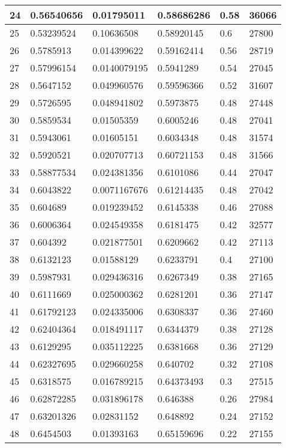 \begin{longtable}{|l|l|l|l|l|l|}
24 & 0.56540656 & 0.01795011 & 0.58686286 & 0.58 & 36066 \\ \hline 
25 & 0.53239524 & 0.10636508 & 0.58920145 & 0.6 & 27800 \\ \hline 
26 & 0.5785913 & 0.014399622 & 0.59162414 & 0.56 & 28719 \\ \hline 
27 & 0.57996154 & 0.0140079195 & 0.5941289 & 0.54 & 27045 \\ \hline 
28 & 0.5647152 & 0.049960576 & 0.59596366 & 0.52 & 31607 \\ \hline 
29 & 0.5726595 & 0.048941802 & 0.5973875 & 0.48 & 27448 \\ \hline 
30 & 0.5859534 & 0.01505359 & 0.6005246 & 0.48 & 27041 \\ \hline 
31 & 0.5943061 & 0.01605151 & 0.6034348 & 0.48 & 31574 \\ \hline 
32 & 0.5920521 & 0.020707713 & 0.60721153 & 0.48 & 31566 \\ \hline 
33 & 0.58877534 & 0.024381356 & 0.6101086 & 0.44 & 27047 \\ \hline 
34 & 0.6043822 & 0.0071167676 & 0.61214435 & 0.48 & 27042 \\ \hline 
35 & 0.604689 & 0.019239452 & 0.6145338 & 0.46 & 27088 \\ \hline 
36 & 0.6006364 & 0.024549358 & 0.6181475 & 0.42 & 32577 \\ \hline 
37 & 0.604392 & 0.021877501 & 0.6209662 & 0.42 & 27113 \\ \hline 
38 & 0.6132123 & 0.01588129 & 0.6233791 & 0.4 & 27100 \\ \hline 
39 & 0.5987931 & 0.029436316 & 0.6267349 & 0.38 & 27165 \\ \hline 
40 & 0.6111669 & 0.025000362 & 0.6281201 & 0.36 & 27147 \\ \hline 
41 & 0.61792123 & 0.024335006 & 0.6308337 & 0.36 & 27460 \\ \hline 
42 & 0.62404364 & 0.018491117 & 0.6344379 & 0.38 & 27128 \\ \hline 
43 & 0.6129295 & 0.035112225 & 0.6381668 & 0.36 & 27129 \\ \hline 
44 & 0.62327695 & 0.029660258 & 0.640702 & 0.32 & 27108 \\ \hline 
45 & 0.6318575 & 0.016789215 & 0.64373493 & 0.3 & 27515 \\ \hline 
46 & 0.62872285 & 0.031896178 & 0.646388 & 0.26 & 27984 \\ \hline 
47 & 0.63201326 & 0.02831152 & 0.648892 & 0.24 & 27152 \\ \hline 
48 & 0.6454503 & 0.01393163 & 0.65159696 & 0.22 & 27155 \\ \hline 

\end{longtable}

